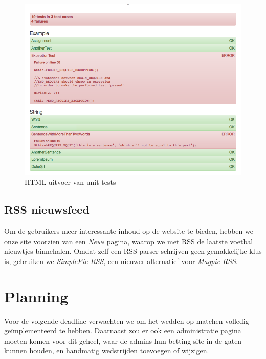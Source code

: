 \documentclass[11pt]{article}
\begin{document}
\begin{figure}[h!]
	\begin{center}
	\includegraphics[scale=0.39]{unit-tests.png}

	\caption{HTML uitvoer van unit tests}
	\label{fig:unit-tests}
	\end{center}
\end{figure}




\subsection{RSS nieuwsfeed}

Om de gebruikers meer interessante inhoud op de website te bieden, hebben we onze site voorzien van een \emph{News} pagina, waarop we met RSS de laatste voetbal nieuwtjes binnehalen. Omdat zelf een RSS parser schrijven geen gemakkelijke klus is, gebruiken we \emph{SimplePie RSS}, een nieuwer alternatief voor \emph{Magpie RSS}.



\section{Planning}

Voor de volgende deadline verwachten we om het wedden op matchen volledig ge\"implementeerd te hebben. Daarnaast zou er ook een administratie pagina moeten komen voor dit geheel, waar de admins hun betting site in de gaten kunnen houden, en handmatig wedstrijden toevoegen of wijzigen.\\
\end{document}
